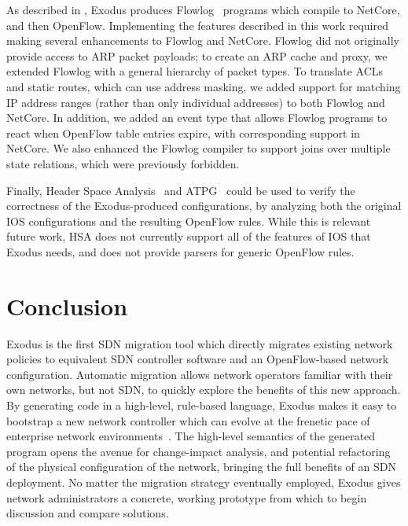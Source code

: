 As described in , Exodus produces
Flowlog~\cite{ngdfk:hotsdn13-flowlog} programs which compile to
NetCore, and then OpenFlow.
Implementing the features described in this work required making
several enhancements to Flowlog and NetCore.
Flowlog did not originally provide access to ARP packet payloads;
to create an ARP cache and proxy, we extended Flowlog with a
general hierarchy of packet types.
To translate ACLs and static routes, which can use address
masking, we added support for matching IP address ranges (rather than
only individual addresses) to both Flowlog and NetCore. In addition, we added
an event type that allows Flowlog programs to react when
OpenFlow table entries expire, with corresponding support in NetCore.
We also enhanced the Flowlog
compiler to support joins over multiple state relations, which were
previously forbidden.


Finally, Header Space Analysis~\cite{kazemian:nsdi12-hsa} and
ATPG~\cite{zeng12test}
could be used to verify the correctness of the Exodus-produced configurations,
by analyzing both the original IOS configurations and the resulting OpenFlow rules.
While this is relevant future work, HSA does not currently support 
all of the features of IOS that Exodus needs, and does not provide parsers for
generic OpenFlow rules.




\section{Conclusion}
\label{sec:conclusion}

Exodus is the first SDN migration tool which directly migrates existing network
policies to equivalent SDN controller software and an OpenFlow-based
network configuration. Automatic migration allows network operators familiar
with their own networks, but not SDN, to quickly explore the benefits of this new
approach.
By generating code in a high-level, rule-based language, Exodus
makes it easy to bootstrap a new network controller which can evolve
at the frenetic pace of enterprise network environments~\cite{kim11evolution}.
The high-level semantics of the generated program opens the avenue
for change-impact analysis, and potential refactoring of the physical 
configuration of the network, bringing the full benefits of an SDN
deployment.
No matter the migration strategy eventually employed, Exodus gives
network administrators a concrete, working prototype from which to begin
discussion and compare solutions.

